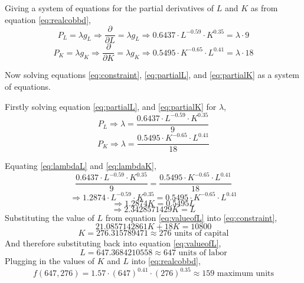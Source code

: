 \documentclass[a4paper,12pt]{article}
\theoremstyle{definition}
\begin{document}
Giving a system of equations for the partial derivatives of $L$ and $K$ as from equation \eqref{eq:realcobbd},
\begin{equation}\label{eq:partialL}
	P_L=\lambda g_L \Rightarrow \frac{\partial}{\partial L} =  \lambda g_L \Rightarrow 0.6437\cdot L^{-0.59} \cdot K^{0.35} = \lambda \cdot 9
\end{equation}
\begin{equation}\label{eq:partialK}
	P_K = \lambda g_K \Rightarrow \frac{\partial}{\partial K} = \lambda g_K \Rightarrow 0.5495 \cdot K^{-0.65}\cdot L^{0.41} = \lambda \cdot 18
\end{equation}

Now solving equations \eqref{eq:constraint}, \eqref{eq:partialL}, and \eqref{eq:partialK} as a system of equations.

Firstly solving equation \eqref{eq:partialL}, and \eqref{eq:partialK} for $\lambda$,
\begin{equation}\label{eq:lambdaL}
	P_L \Rightarrow \lambda = \frac{0.6437\cdot L^{-0.59} \cdot K^{0.35}}{9}
\end{equation}
\begin{equation}\label{eq:lambdaK}
	P_K \Rightarrow \lambda = \frac{0.5495 \cdot K^{-0.65}\cdot L^{0.41}}{18}
\end{equation}

Equating \eqref{eq:lambdaL} and \eqref{eq:lambdaK},
\begin{equation}
		\frac{0.6437\cdot L^{-0.59} \cdot K^{0.35}}{9} = \frac{0.5495 \cdot K^{-0.65}\cdot L^{0.41}}{18}
\end{equation}
\begin{equation}
		\Rightarrow	1.2874 \cdot L^{-0.59} \cdot K^{0.35} = 0.5495 \cdot K^{-0.65}\cdot L^{0.41}
\end{equation}
\begin{equation}
	\Rightarrow 1.2874 K^{}=0.5495L^{}
\end{equation}
\begin{equation}\label{eq:valueofL}
	\Rightarrow2.3428571429K=L
\end{equation}
Substituting the value of $L$ from equation \eqref{eq:valueofL} into \eqref{eq:constraint},
\begin{equation}
	21.0857142861K+18K=10800
\end{equation}
\begin{equation}
	K=276.315789471 \approx 276 \text{ units of capital}
\end{equation}
And therefore substituting back into equation \eqref{eq:valueofL},
\begin{equation}
	L=647.3684210558 \approx 647 \text{ units of labor}
\end{equation}
Plugging in the values of $K$ and $L$ into \eqref{eq:realcobbd},
\begin{equation}
	f(647, 276)=1.57 \cdot (647)^{0.41} \cdot (276)^{0.35} \approx 159 \text{ maximum units}
\end{equation}
\end{document}
